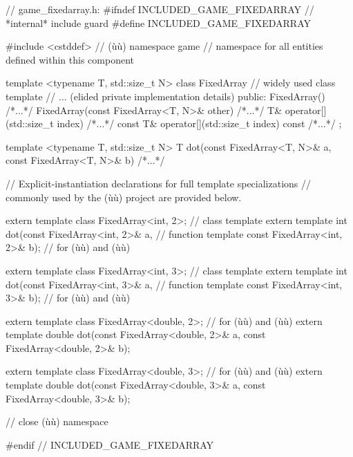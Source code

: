 \begin{emcppslisting}[emcppsbatch=e4]
// game_fixedarray.h:
#ifndef INCLUDED_GAME_FIXEDARRAY  // *internal* include guard
#define INCLUDED_GAME_FIXEDARRAY

#include <cstddef>  // (ù{}ù)
namespace game  // namespace for all entities defined within this component
{

template <typename T, std::size_t N>
class FixedArray                                  // widely used class template
{
    // ... (elided private implementation details)
public:
    FixedArray()                                 { /*...*/ }
    FixedArray(const FixedArray<T, N>& other)    { /*...*/ }
    T& operator[](std::size_t index)             { /*...*/ }
    const T& operator[](std::size_t index) const { /*...*/ }
};

template <typename T, std::size_t N>
T dot(const FixedArray<T, N>& a, const FixedArray<T, N>& b) { /*...*/ }

// Explicit-instantiation declarations for full template specializations
// commonly used by the (ù{}ù) project are provided below.

extern template class FixedArray<int, 2>;              // class template
extern template int dot(const FixedArray<int, 2>& a,   // function template
                        const FixedArray<int, 2>& b);  // for (ù{}ù) and (ù{}ù)

extern template class FixedArray<int, 3>;              // class template
extern template int dot(const FixedArray<int, 3>& a,   // function template
                        const FixedArray<int, 3>& b);  // for (ù{}ù) and (ù{}ù)

extern template class FixedArray<double, 2>;           // for (ù{}ù) and (ù{}ù)
extern template double dot(const FixedArray<double, 2>& a,
                           const FixedArray<double, 2>& b);

extern template class FixedArray<double, 3>;           // for (ù{}ù) and (ù{}ù)
extern template double dot(const FixedArray<double, 3>& a,
                           const FixedArray<double, 3>& b);

}  // close (ù{}ù) namespace

#endif  // INCLUDED_GAME_FIXEDARRAY
\end{emcppslisting}

